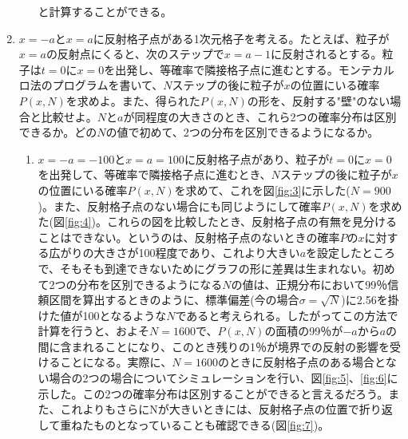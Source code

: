 \documentclass{jsarticle}
\begin{document}
\begin{enumerate}
\begin{enumerate}
                    と計算することができる。
                    
                \end{enumerate}
            
            \item  $x=-a$と$x=a$に反射格子点がある1次元格子を考える。たとえば、粒子が$x=a$の反射点にくると、次のステップで$x=a-1$に反射されるとする。粒子は$t=0$に$x=0$を出発し、等確率で隣接格子点に進むとする。モンテカルロ法のプログラムを書いて、$N$ステップの後に粒子が$x$の位置にいる確率$P(x,N)$を求めよ。また、得られた$P(x,N)$の形を、反射する"壁"のない場合と比較せよ。$N$と$a$が同程度の大きさのとき、これら2つの確率分布は区別できるか。どの$N$の値で初めて、2つの分布を区別できるようになるか。
            
                \begin{enumerate}
                    \item $x=-a=-100$と$x=a=100$に反射格子点があり、粒子が$t=0$に$x=0$を出発して、等確率で隣接格子点に進むとき、$N$ステップの後に粒子が$x$の位置にいる確率$P(x,N)$を求めて、これを図\ref{fig:3}に示した($N=900$)。また、反射格子点のない場合にも同じようにして確率$P(x,N)$を求めた(図\ref{fig:4})。これらの図を比較したとき、反射格子点の有無を見分けることはできない。というのは、反射格子点のないときの確率$P$の$x$に対する広がりの大きさが100程度であり、これより大きい$a$を設定したところで、そもそも到達できないためにグラフの形に差異は生まれない。初めて2つの分布を区別できるようになる$N$の値は、正規分布において99％信頼区間を算出するときのように、標準偏差(今の場合$\sigma=\sqrt N$)に2.56を掛けた値が100となるような$N$であると考えられる。したがってこの方法で計算を行うと、およそ$N=1600$で、$P(x,N)$の面積の99％が$-a$から$a$の間に含まれることになり、このとき残りの1％が境界での反射の影響を受けることになる。実際に、$N=1600$のときに反射格子点のある場合とない場合の2つの場合についてシミュレーションを行い、図\ref{fig:5}、\ref{fig:6}に示した。この2つの確率分布は区別することができると言えるだろう。また、これよりもさらにNが大きいときには、反射格子点の位置で折り返して重ねたものとなっていることも確認できる(図\ref{fig:7})。
                    

\end{enumerate}
\end{enumerate}
\end{document}
